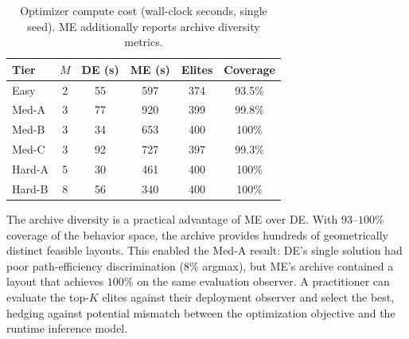 \documentclass[letterpaper, 10pt, conference]{ieeeconf}
\begin{document}
\begin{table}[t]
\centering
\caption{Optimizer compute cost (wall-clock seconds, single seed).
  ME additionally reports archive diversity metrics.}
\label{tab:compute}
\small
\begin{tabular}{@{}lccccc@{}}
\toprule
\textbf{Tier} & $M$ &
  DE (s) & ME (s) &
  Elites & Coverage \\
\midrule
Easy   & 2 &  55 &  597 & 374 & 93.5\% \\
Med-A  & 3 &  77 &  920 & 399 & 99.8\% \\
Med-B  & 3 &  34 &  653 & 400 & 100\%  \\
Med-C  & 3 &  92 &  727 & 397 & 99.3\% \\
Hard-A & 5 &  30 &  461 & 400 & 100\%  \\
Hard-B & 8 &  56 &  340 & 400 & 100\%  \\
\bottomrule
\end{tabular}
\end{table}

The archive diversity is a practical advantage of ME over DE.
With $93$--$100$\% coverage of the behavior space, the archive
provides hundreds of geometrically distinct feasible layouts.
This enabled the Med-A result: DE's single solution had poor
path-efficiency discrimination ($8$\% argmax), but ME's archive
contained a layout that achieves $100$\% on the same evaluation
observer.  A practitioner can evaluate the top-$K$ elites against
their deployment observer and select the best, hedging against
potential mismatch between the optimization objective and the
runtime inference model.
\end{document}
